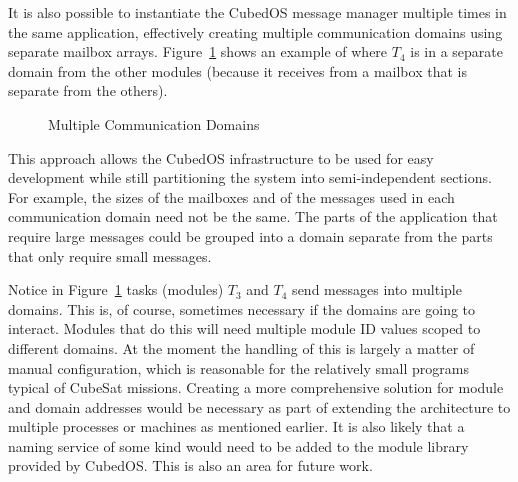 It is also possible to instantiate the CubedOS message manager multiple times in the same
application, effectively creating multiple communication domains using separate mailbox arrays.
Figure~\ref{fig:multi-domain} shows an example of where $T_4$ is in a separate domain from the
other modules (because it receives from a mailbox that is separate from the others).

\begin{figure}[tbhp]
  \center
  \caption{Multiple Communication Domains}
  \label{fig:multi-domain}
\end{figure}

This approach allows the CubedOS infrastructure to be used for easy development while still
partitioning the system into semi-independent sections. For example, the sizes of the mailboxes
and of the messages used in each communication domain need not be the same. The parts of the
application that require large messages could be grouped into a domain separate from the parts
that only require small messages.

Notice in Figure~\ref{fig:multi-domain} tasks (modules) $T_3$ and $T_4$ send messages into
multiple domains. This is, of course, sometimes necessary if the domains are going to interact.
Modules that do this will need multiple module ID values scoped to different domains. At the
moment the handling of this is largely a matter of manual configuration, which is reasonable for
the relatively small programs typical of CubeSat missions. Creating a more comprehensive
solution for module and domain addresses would be necessary as part of extending the
architecture to multiple processes or machines as mentioned earlier. It is also likely that a
naming service of some kind would need to be added to the module library provided by CubedOS.
This is also an area for future work.
